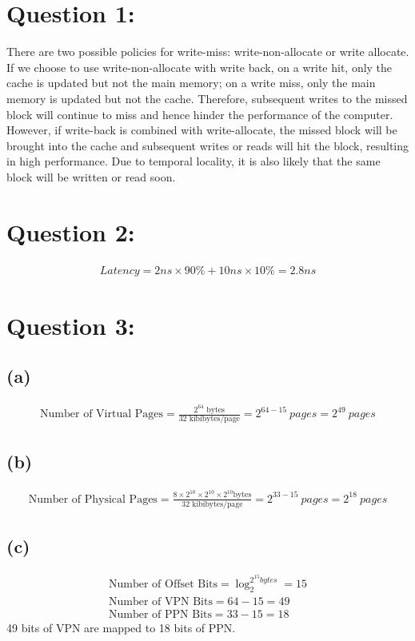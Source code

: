 \documentclass{article}
\begin{document}
	\section{Question 1:}
	There are two possible policies for write-miss: write-non-allocate or write allocate. If we choose to use write-non-allocate with write back, on a write hit, only the cache is updated but not the main memory; on a write miss, only the main memory is updated but not the cache. Therefore, subsequent writes to the missed block will continue to miss and hence hinder the performance of the computer. However, if write-back is combined with write-allocate, the missed block will be brought into the cache and subsequent writes or reads will hit the block, resulting in high performance. Due to temporal locality, it is also likely that the same block will be written or read soon.
	\section{Question 2:}
	\begin{align*}
		Latency = 2ns \times 90\% + 10ns \times 10\% = 2.8ns
	\end{align*}
	\section{Question 3:}
	\subsection{(a)}
	\begin{align*}
		\mbox{Number of Virtual Pages} = \frac{2^{64} \mbox{ bytes}}{32 \mbox{ kibibytes/page}} = 2^{64-15}\ pages = 2^{49}\ pages
	\end{align*}
	\subsection{(b)}
	\begin{align*}
		\mbox{Number of Physical Pages} = \frac{8\times 2^{10} \times 2^{10} \times 2^{10} \mbox{bytes}}{32 \mbox{ kibibytes/page}} = 2^{33-15}\ pages = 2^{18}\ pages
	\end{align*}
	\subsection{(c)}
	\begin{align*}
		\mbox{Number of Offset Bits} = \log_{2}^{2^{15} bytes} = 15\\
		\mbox{Number of VPN Bits} = 64 - 15 = 49 \\
		\mbox{Number of PPN Bits} = 33 - 15 = 18
	\end{align*}
	49 bits of VPN are mapped to 18 bits of PPN.
\end{document}
